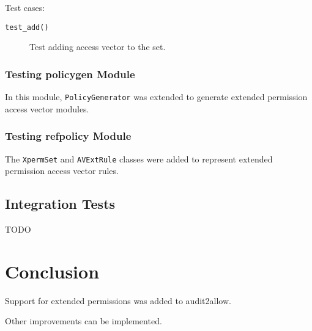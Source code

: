 Test cases:
\begin{description}
    \item [\texttt{test\_add()}] Test adding access vector to the set.
\end{description}

\subsection{Testing policygen Module}

In this module, \texttt{PolicyGenerator} was extended to generate extended
permission access vector modules.

\subsection{Testing refpolicy Module}

The \texttt{XpermSet} and \texttt{AVExtRule} classes were added to represent
extended permission access vector rules.

\section{Integration Tests}

TODO

\chapter{Conclusion}



Support for extended permissions was added to audit2allow.

Other improvements can be implemented.
